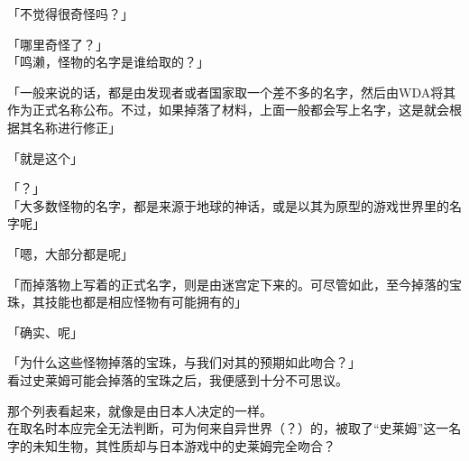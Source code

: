 「不觉得很奇怪吗？」

「哪里奇怪了？」\\

「鸣濑，怪物的名字是谁给取的？」

「一般来说的话，都是由发现者或者国家取一个差不多的名字，然后由WDA将其作为正式名称公布。不过，如果掉落了材料，上面一般都会写上名字，这是就会根据其名称进行修正」

「就是这个」

「？」\\

「大多数怪物的名字，都是来源于地球的神话，或是以其为原型的游戏世界里的名字呢」

「嗯，大部分都是呢」

「而掉落物上写着的正式名字，则是由迷宫定下来的。可尽管如此，至今掉落的宝珠，其技能也都是相应怪物有可能拥有的」

「确实、呢」

「为什么这些怪物掉落的宝珠，与我们对其的预期如此吻合？」\\

看过史莱姆可能会掉落的宝珠之后，我便感到十分不可思议。

那个列表看起来，就像是由日本人决定的一样。\\

在取名时本应完全无法判断，可为何来自异世界（？）的，被取了“史莱姆”这一名字的未知生物，其性质却与日本游戏中的史莱姆完全吻合？\\

